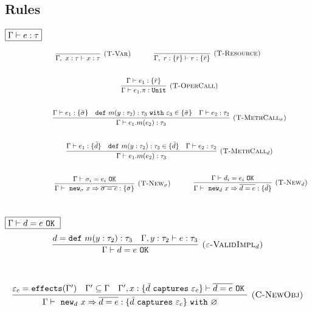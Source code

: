 \documentclass{llncs}
\newcommand{\keywadj}[1]{\mathtt{#1}}
\newcommand{\keyw}[1]{\keywadj{#1}~}
\begin{document}
\subsection{Rules}

$\fbox{$\Gamma \vdash e : \tau$}$

\[
\begin{array}{c}
\infer[\textsc{(T-Var)}]
	{\Gamma,~x : \tau \vdash x : \tau}
	{}
~~~~~~~~~~
\infer[\textsc{(T-Resource)}]
	{\Gamma,~r : \{ \bar r \} \vdash r : \{ \bar r \}}
	{} \\[5ex]
~~~~~~~~~~
\infer[\textsc{(T-OperCall)}]
	{\Gamma \vdash e_1.\pi : \keywadj{Unit}}
	{\Gamma \vdash e_1 : \{ \bar r \}} \\[5ex]
~~~~~~~~~~
\infer[\textsc{(T-MethCall$_\sigma$)}]
	{\Gamma \vdash e_1.m(e_2) : \tau_3}
	{\Gamma \vdash e_1 : \{ \bar \sigma \} & \keyw{def} m(y : \tau_2) : \tau_3~\keyw{with} \varepsilon_3 \in \{ \bar \sigma \} &  \Gamma \vdash e_2 : \tau_2 }\\[5ex]
~~~~~~~~~~
\infer[\textsc{(T-MethCall$_d$)}]
	{\Gamma \vdash e_1.m(e_2) : \tau_3}
	{\Gamma \vdash e_1 : \{ \bar d\} & \keyw{def} m(y : \tau_2) : \tau_3 \in \{ \bar d \} &  \Gamma \vdash e_2 : \tau_2 }\\[5ex]
~~~~~~~~~~

~~~~~~~~~~
\infer[\textsc{(T-New$_\sigma$)}]
	{\Gamma \vdash~\keywadj{new}_\sigma~x \Rightarrow \overline{\sigma = e} : \{ \bar \sigma \}}
	{\Gamma \vdash \sigma_i = e_i~\keywadj{OK}}
~~~~~~~~~~
\infer[\textsc{(T-New$_d$)}]
	{\Gamma \vdash~\keywadj{new}_d~x \Rightarrow \overline{d = e} : \{ \bar d \}}
	{\Gamma \vdash d_i = e_i~\keywadj{OK}}\\[5ex]
\end{array}
\]

$\fbox{$\Gamma \vdash d = e~\keyw{OK}$}$
\[
\begin{array}{c}
\infer[\textsc{($\varepsilon$-ValidImpl$_d$)}]
	{\Gamma \vdash d = e~\keywadj{OK}}
	{d = \keyw{def} m(y : \tau_2) : \tau_3 & \Gamma, y : \tau_2 \vdash e : \tau_3}
	\\[5ex]
\end{array}
\]

\fbox{$\Gamma \vdash e : \tau~\keyw{with} \varepsilon$}

\[
\begin{array}{c}
\infer[\textsc{(C-NewObj)}]
	{\Gamma \vdash~\keywadj{new}_d~x \Rightarrow \overline{d = e} : \{  \bar d~\keyw{captures} \varepsilon_c \} ~\keyw{with} \varnothing }
	{\varepsilon_c = \keywadj{effects}(\Gamma') & \Gamma' \subseteq \Gamma & \Gamma', x : \{ \bar d~\keyw {captures} \varepsilon_c \} \vdash \overline{d = e}~\keyw{OK}} \\[5ex]
\end{array}
\]
\end{document}
